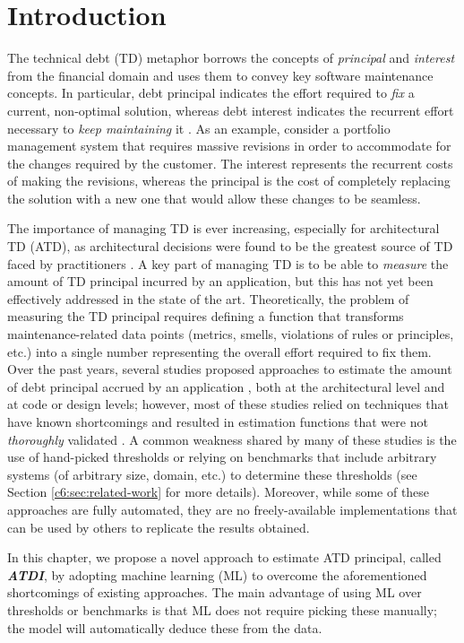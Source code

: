 \section{Introduction}\label{c6:sec:Intro}
The technical debt (TD) metaphor borrows the concepts of \emph{principal} and \emph{interest} from the financial domain and uses them to convey key software maintenance concepts.
In particular, debt principal indicates the effort required to \emph{fix} a current, non-optimal solution, whereas debt interest indicates the recurrent effort necessary to \emph{keep maintaining} it \cite{Avgeriou2016}.
As an example, consider a portfolio management system that requires massive revisions in order to accommodate for the changes required by the customer\cite{Cunningham1992}. The interest represents the recurrent costs of making the revisions, whereas the principal is the cost of completely replacing the solution with a new one that would allow these changes to be seamless.

The importance of managing TD is ever increasing, especially for architectural TD (ATD), as architectural decisions were found to be the greatest source of TD faced by practitioners \cite{Ernst2015}.
A key part of managing TD is to be able to \emph{measure} the amount of TD principal incurred by an application, but this has not yet been effectively addressed in the state of the art.
Theoretically, the problem of measuring the TD principal requires defining a function that transforms maintenance-related data points (metrics, smells, violations of rules or principles, etc.) into a single number representing the overall effort required to fix them.
Over the past years, several studies proposed approaches to estimate the amount of debt principal accrued by an application \cite{Khomyakov2020,Avgeriou2021}, both at the architectural level and at code or design levels; however, most of these studies relied on techniques that have known shortcomings and resulted in estimation functions that were not \emph{thoroughly} validated \cite{Khomyakov2020}.
A common weakness shared by many of these studies is the use of hand-picked thresholds or relying on benchmarks that include arbitrary systems (of arbitrary size, domain, etc.) to determine these thresholds (see Section \ref{c6:sec:related-work} for more details).
Moreover, while some of these approaches are fully automated, they are no freely-available implementations that can be used by others to replicate the results obtained.

In this chapter, we propose a novel approach to estimate ATD principal, called \textbf{\emph{ATDI}}, by adopting machine learning (ML) to overcome the aforementioned shortcomings of existing approaches.
The main advantage of using ML over thresholds or benchmarks is that ML does not require picking these manually; the model will automatically deduce these from the data.

